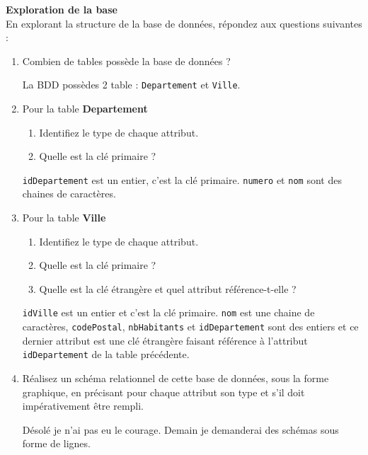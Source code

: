 \documentclass[a4paper,12pt,french]{book}
\begin{document}


\textbf{Exploration de la base}\\	

En explorant la structure de la base de données, répondez aux questions suivantes :

\begin{enumerate}
	\item 	Combien de tables possède la base de données ? 
            \begin{corrige}
            La BDD possèdes 2 table : \texttt{Departement} et \texttt{Ville}.
            \end{corrige}
	\item 	Pour la table \textbf{Departement}
	\begin{enumerate}[\bfseries a.]
		\item 	Identifiez le type de chaque attribut.
		\item 	Quelle est la clé primaire ?	
	\end{enumerate}	
            \begin{corrige}
            \texttt{idDepartement} est un entier, c'est la clé primaire. \texttt{numero} et \texttt{nom} sont des chaines de caractères.
            \end{corrige}
	\item Pour la table \textbf{Ville}
		\begin{enumerate}[\bfseries a.]
		\item 	Identifiez le type de chaque attribut.
		\item 	Quelle est la clé primaire ?
		\item 	Quelle est la clé étrangère et quel attribut référence-t-elle ?	
	\end{enumerate}	
    \begin{corrige}
    \texttt{idVille} est un entier et c'est la clé primaire. \texttt{nom} est une chaine de caractères, \texttt{codePostal}, \texttt{nbHabitants} et \texttt{idDepartement} sont des entiers et ce dernier attribut est une clé étrangère faisant référence à l'attribut \texttt{idDepartement} de la table précédente.
    \end{corrige}
	\item 	 Réalisez un schéma relationnel de cette base de données, sous la forme graphique, en précisant pour chaque attribut son type et s’il doit impérativement être rempli.
    \begin{corrige}
    Désolé je n'ai pas eu le courage. Demain je demanderai des schémas sous forme de lignes.
    \end{corrige}
\end{enumerate}
\end{document}
